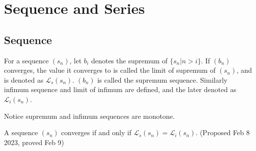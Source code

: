 \documentclass[../note.tex]{subfiles}
\begin{document}
\section{Sequence and Series}
\subsection{Sequence}
\begin{definition}[Sequence]
\end{definition}

\begin{definition}
\end{definition}

\begin{definition}
\end{definition}

\begin{definition}\label{def:limiSupremum}
	For a sequence $(s_n)$, let $b_i$ denotes the supremum of $\{s_n|n>i\}$.
	If $(b_n)$ converges, the value it converges to is called the limit of supremum of $(s_n)$, and is denoted as $\mathcal{L}_s (s_n)$. 
	$(b_n)$ is called the supremum sequence.
	Similarly infimum sequence and limit of infimum are defined, and the later denoted as $\mathcal{L}_i(s_n)$. 
\end{definition}

\begin{remark}
	Notice supremum and infimum sequences are monotone.
\end{remark}
\begin{theorem} \label{analysis:th:Convergence_and_limit_of_sup_in}
	A sequence $(s_n)$ converges if and only if $\mathcal{L}_s (s_n) = \mathcal{L}_i(s_n)$. 
	(Proposed Feb 8 2023, proved Feb 9)
\end{theorem}
\end{document}
